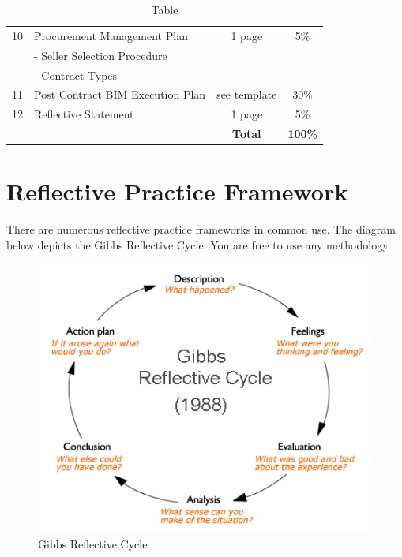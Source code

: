 \begin{table}[ht]
\begin{tabular}{|c|l|c|c|}
		10  & Procurement Management Plan &  1 page  & 5\% \\
   			&	- Seller Selection Procedure  & & \\
   			&	- Contract Types  & & \\
		\hline

		11  & Post Contract BIM Execution Plan &  see template  & 30\% \\
		\hline
		12  & Reflective Statement &  1 page  & 5\% \\
		
		
		\hline
		\hline
        & & \textbf{Total} & \textbf{100\%} \\
		\hline
	
	\end{tabular}
	\caption{Table }
	\label{tab:AM}
\end{table}


\newpage

\section*{Reflective Practice Framework}

There are numerous reflective practice frameworks in common use.  The diagram below depicts the Gibbs Reflective Cycle.  You are free to use any methodology.


\begin{figure}[h!]
	\centering
	\includegraphics[width=1.0\linewidth]{img/gibbs-diagram}
	\caption{Gibbs Reflective Cycle}
	\label{fig:gibbs-diagram}
\end{figure}





